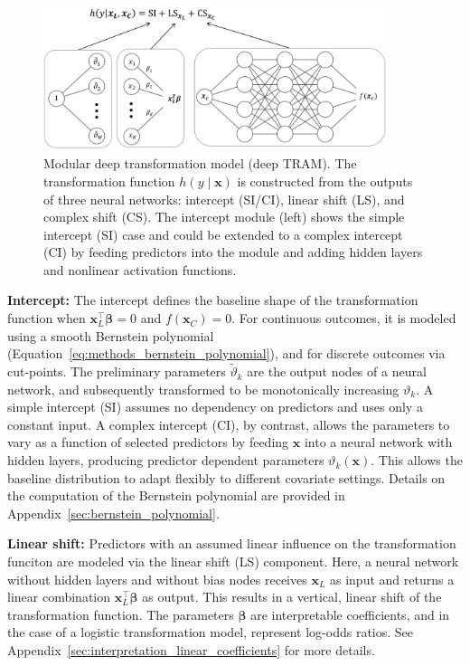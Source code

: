 \begin{figure}[H]
\centering
\includegraphics[width=0.9\textwidth]{img/deep_tram.png}
\caption{Modular deep transformation model (deep TRAM). The transformation function $h(y \mid \mathbf{x})$ is constructed from the outputs of three neural networks: intercept (SI/CI), linear shift (LS), and complex shift (CS). The intercept module (left) shows the simple intercept (SI) case and could be extended to a complex intercept (CI) by feeding predictors into the module and adding hidden layers and nonlinear activation functions.}
\label{fig:deep_tram}
\end{figure}

\medskip


\textbf{Intercept:} The intercept defines the baseline shape of the transformation function when $\mathbf{x}_{L}^\top \boldsymbol{\beta} = 0$ and $f(\mathbf{x}_{C}) = 0$. For continuous outcomes, it is modeled using a smooth Bernstein polynomial (Equation~\ref{eq:methods_bernstein_polynomial}), and for discrete outcomes via cut-points. The preliminary parameters $\tilde{\vartheta}_k$ are the output nodes of a neural network, and subsequently transformed to be monotonically increasing $\vartheta_k$. A simple intercept (SI) assumes no dependency on predictors and uses only a constant input. A complex intercept (CI), by contrast, allows the parameters to vary as a function of selected predictors by feeding $\mathbf{x}$ into a neural network with hidden layers, producing predictor dependent parameters $\vartheta_k(\mathbf{x})$. This allows the baseline distribution to adapt flexibly to different covariate settings. Details on the computation of the Bernstein polynomial are provided in Appendix~\ref{sec:bernstein_polynomial}.

\medskip

\textbf{Linear shift:} Predictors with an assumed linear influence on the transformation funciton are modeled via the linear shift (LS) component. Here, a neural network without hidden layers and without bias nodes receives $\mathbf{x}_{L}$ as input and returns a linear combination $\mathbf{x}_{L}^\top \boldsymbol{\beta}$ as output. This results in a vertical, linear shift of the transformation function. The parameters $\boldsymbol{\beta}$ are interpretable coefficients, and in the case of a logistic transformation model, represent log-odds ratios. See Appendix~\ref{sec:interpretation_linear_coefficients} for more details.

